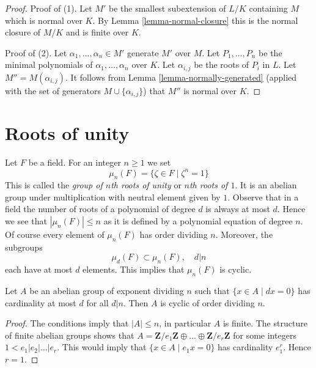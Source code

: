 \begin{proof}
Proof of (1). Let $M'$ be the smallest subextension of $L/K$ containing $M$
which is normal over $K$. By Lemma \ref{lemma-normal-closure}
this is the normal closure of $M/K$ and is finite over $K$.

\medskip\noindent
Proof of (2). Let $\alpha_1, \ldots, \alpha_n \in M'$ generate $M'$ over $M$.
Let $P_1, \ldots, P_n$ be the minimal polynomials of
$\alpha_1, \ldots, \alpha_n$ over $K$. Let $\alpha_{i, j}$ be the roots
of $P_i$ in $L$. Let $M''  = M(\alpha_{i, j})$. It follows from
Lemma \ref{lemma-normally-generated}
(applied with the set of generators $M \cup \{\alpha_{i, j}\}$)
that $M''$ is normal over $K$.
\end{proof}











\section{Roots of unity}
\label{section-roots-of-1}

\noindent
Let $F$ be a field. For an integer $n \geq 1$ we set
$$
\mu_n(F) = \{\zeta \in F \mid \zeta^n = 1\}
$$
This is called the {\it group of $n$th roots of unity} or
{\it $n$th roots of $1$}. It is an abelian group under multiplication
with neutral element given by $1$.
Observe that in a field the number of roots of a polynomial of degree $d$
is always at most $d$. Hence we see that $|\mu_n(F)| \leq n$
as it is defined by a polynomial equation of degree $n$.
Of course every element of $\mu_n(F)$ has order dividing $n$.
Moreover, the subgroups
$$
\mu_d(F) \subset \mu_n(F),\quad d | n
$$
each have at most $d$ elements. This implies that $\mu_n(F)$ is cyclic.

\begin{lemma}
\label{lemma-cyclic}
Let $A$ be an abelian group of exponent dividing $n$ such that
$\{x \in A \mid dx = 0\}$ has cardinality at most $d$ for all $d | n$.
Then $A$ is cyclic of order dividing $n$.
\end{lemma}

\begin{proof}
The conditions imply that $|A| \leq n$, in particular $A$ is finite.
The structure of finite abelian groups shows that
$A = \mathbf{Z}/e_1\mathbf{Z} \oplus \ldots \oplus \mathbf{Z}/e_r\mathbf{Z}$
for some integers $1 < e_1 | e_2 | \ldots | e_r$. This would imply
that $\{x \in A \mid e_1 x = 0\}$ has cardinality $e_1^r$. Hence
$r = 1$.
\end{proof}

